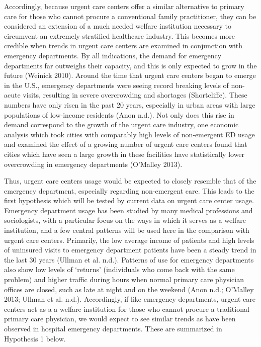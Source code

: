 \documentclass[12pt,twoside]{reedthesis}
\begin{document}
  Accordingly, because urgent care centers offer a similar alternative to
  primary care for those who cannot procure a conventional family
  practitioner, they can be considered an extension of a much needed
  welfare institution necessary to circumvent an extremely stratified
  healthcare industry. This becomes more credible when trends in urgent
  care centers are examined in conjunction with emergency departments. By
  all indications, the demand for emergency departments far outweighs
  their capacity, and this is only expected to grow in the future (Weinick
  2010). Around the time that urgent care centers began to emerge in the
  U.S., emergency departments were seeing record breaking levels of
  non-acute visits, resulting in severe overcrowding and shortages
  (Shortcliffe). These numbers have only risen in the past 20 years,
  especially in urban areas with large populations of low-income residents
  (Anon n.d.). Not only does this rise in demand correspond to the growth
  of the urgent care industry, one economic analysis which took cities
  with comparably high levels of non-emergent ED usage and examined the
  effect of a growing number of urgent care centers found that cities
  which have seen a large growth in these facilities have statistically
  lower overcrowding in emergency departments (O'Malley 2013).
  
  Thus, urgent care centers usage would be expected to closely resemble
  that of the emergency department, especially regarding non-emergent
  care. This leads to the first hypothesis which will be tested by current
  data on urgent care center usage. Emergency department usage has been
  studied by many medical professions and sociologists, with a particular
  focus on the ways in which it serves as a welfare institution, and a few
  central patterns will be used here in the comparison with urgent care
  centers. Primarily, the low average income of patients and high levels
  of uninsured visits to emergency department patients have been a steady
  trend in the last 30 years (Ullman et al. n.d.). Patterns of use for
  emergency departments also show low levels of `returns' (individuals who
  come back with the same problem) and higher traffic during hours when
  normal primary care physician offices are closed, such as late at night
  and on the weekend (Anon n.d.; O'Malley 2013; Ullman et al. n.d.).
  Accordingly, if like emergency departments, urgent care centers act as a
  a welfare institution for those who cannot procure a traditional primary
  care physician, we would expect to see similar trends as have been
  observed in hospital emergency departments. These are summarized in
  Hypothesis 1 below.
  
\end{document}

